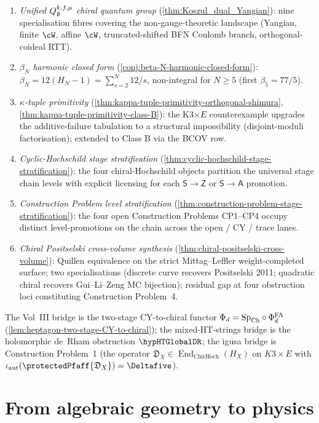 \begin{enumerate}
\item \emph{Unified $Q^{k, f, \mu}_{\mathfrak{g}}$ chiral quantum group}
\textup(\cref{thm:Koszul_dual_Yangian}\textup): nine specialisation
fibres covering the non-gauge-theoretic landscape
\textup(Yangian, finite $\cW$, affine $\cW$, truncated-shifted BFN
Coulomb branch, orthogonal-coideal RTT\textup).
\item \emph{$\beta_N$ harmonic closed form}
\textup(\cref{conj:beta-N-harmonic-closed-form}\textup):
$\beta_N = 12 (H_N - 1) = \sum_{s = 2}^N 12/s$, non-integral for
$N \ge 5$ (first $\beta_5 = 77/5$).
\item \emph{$\kappa$-tuple primitivity}
\textup(\cref{thm:kappa-tuple-primitivity-orthogonal-shimura},
\cref{thm:kappa-tuple-primitivity-class-B}\textup): the K3$\times E$
counterexample upgrades the additive-failure tabulation to a
structural impossibility \textup(disjoint-moduli factorisation\textup);
extended to Class B via the BCOV row.
\item \emph{Cyclic-Hochschild stage stratification}
\textup(\cref{thm:cyclic-hochschild-stage-stratification}\textup):
the four chiral-Hochschild objects partition the universal stage
chain levels with explicit licensing for each $\mathsf{S} \to
\mathsf{Z}$ or $\mathsf{S} \to \mathsf{A}$ promotion.
\item \emph{Construction Problem level stratification}
\textup(\cref{thm:construction-problem-stage-stratification}\textup):
the four open Construction Problems CP1--CP4 occupy distinct
level-promotions on the chain across the open / CY / trace lanes.
\item \emph{Chiral Positselski cross-volume synthesis}
\textup(\cref{thm:chiral-positselski-cross-volume}\textup): Quillen
equivalence on the strict Mittag--Leffler weight-completed surface;
two specialisations \textup(discrete curve recovers Positselski
2011; quadratic chiral recovers Gui--Li--Zeng MC bijection\textup);
residual gap at four obstruction loci constituting Construction
Problem~4.
\end{enumerate}
The Vol~III bridge is the two-stage CY-to-chiral functor
$\Phi_d = \mathrm{Sp}_{\mathrm{Ch}} \circ \Phi^{\mathrm{FA}}_d$
\textup(\cref{lem:heptagon-two-stage-CY-to-chiral}\textup); the
mixed-HT-strings bridge is the holomorphic de~Rham obstruction
$\hypHTGlobalDR$; the igusa bridge is Construction Problem~1
\textup(the operator $\mathfrak D_X\in
\operatorname{End}_{\mathrm{ChirHoch}}(H_X)$ on $K3 \times E$ with
$\iota_{\mathrm{aut}}(\protectedPfaff{\mathfrak D_X}) = \Deltafive$\textup).

\section*{From algebraic geometry to physics}

